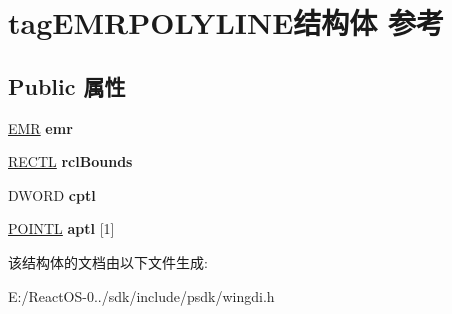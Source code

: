 \hypertarget{structtag_e_m_r_p_o_l_y_l_i_n_e}{}\section{tag\+E\+M\+R\+P\+O\+L\+Y\+L\+I\+N\+E结构体 参考}
\label{structtag_e_m_r_p_o_l_y_l_i_n_e}
\subsection*{Public 属性}
\begin{DoxyCompactItemize}
\item 
\mbox{\label{structtag_e_m_r_p_o_l_y_l_i_n_e_afced3d2862c64329e8a19b55daa2375c}} 
\hyperlink{structtag_e_m_r}{E\+MR} {\bfseries emr}
\item 
\mbox{\label{structtag_e_m_r_p_o_l_y_l_i_n_e_a2a5d0c317c3c4a7550147ad8771ca4c2}} 
\hyperlink{struct___r_e_c_t_l}{R\+E\+C\+TL} {\bfseries rcl\+Bounds}
\item 
\mbox{\label{structtag_e_m_r_p_o_l_y_l_i_n_e_aa2ca734754a1c9151115dfeef083eb74}} 
D\+W\+O\+RD {\bfseries cptl}
\item 
\mbox{\label{structtag_e_m_r_p_o_l_y_l_i_n_e_aa5fa8d8df075b819f45f13d4b248f77a}} 
\hyperlink{struct___p_o_i_n_t_l}{P\+O\+I\+N\+TL} {\bfseries aptl} \mbox{[}1\mbox{]}
\end{DoxyCompactItemize}


该结构体的文档由以下文件生成\+:\begin{DoxyCompactItemize}
\item 
E\+:/\+React\+O\+S-\/0../sdk/include/psdk/wingdi.\+h\end{DoxyCompactItemize}
